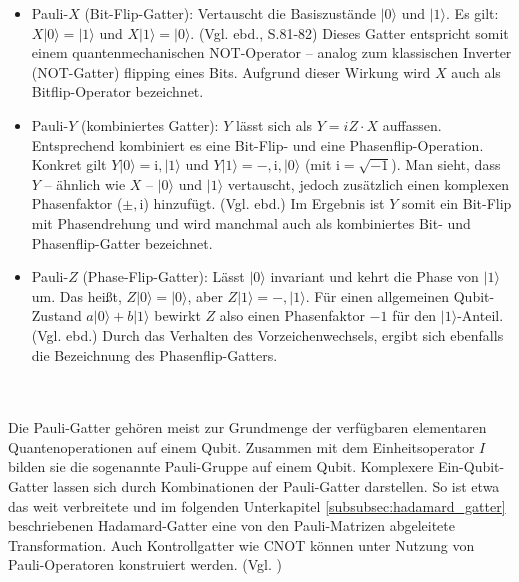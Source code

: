 \begin{itemize}
\item Pauli-$X$ (Bit-Flip-Gatter): Vertauscht die Basiszustände $|0\rangle$ und $|1\rangle$. Es gilt: $X|0\rangle = |1\rangle$ und $X|1\rangle = |0\rangle$. (Vgl. ebd., S.81-82) Dieses Gatter entspricht somit einem quantenmechanischen NOT-Operator – analog zum klassischen Inverter (NOT-Gatter) flipping eines Bits. Aufgrund dieser Wirkung wird $X$ auch als Bitflip-Operator bezeichnet. 

\item Pauli-$Y$ (kombiniertes Gatter): $Y$ lässt sich als $Y = iZ \cdot X$ auffassen. Entsprechend kombiniert es eine Bit-Flip- und eine Phasenflip-Operation. Konkret gilt $Y|0\rangle = \mathrm{i},|1\rangle$ und $Y|1\rangle = -,\mathrm{i},|0\rangle$ (mit $\mathrm{i}=\sqrt{-1}$). Man sieht, dass $Y$ – ähnlich wie $X$ – $|0\rangle$ und $|1\rangle$ vertauscht, jedoch zusätzlich einen komplexen Phasenfaktor ($\pm,\mathrm{i}$) hinzufügt. (Vgl. ebd.) Im Ergebnis ist $Y$ somit ein Bit-Flip mit Phasendrehung und wird manchmal auch als kombiniertes Bit- und Phasenflip-Gatter bezeichnet.

\item Pauli-$Z$ (Phase-Flip-Gatter): Lässt $|0\rangle$ invariant und kehrt die Phase von $|1\rangle$ um. Das heißt, $Z|0\rangle = |0\rangle$, aber $Z|1\rangle = -,|1\rangle$. Für einen allgemeinen Qubit-Zustand $a|0\rangle + b|1\rangle$ bewirkt $Z$ also einen Phasenfaktor $-1$ für den $|1\rangle$-Anteil. (Vgl. ebd.) Durch das Verhalten des Vorzeichenwechsels, ergibt sich ebenfalls die Bezeichnung des Phasenflip-Gatters.

\end{itemize}\\
\\
Die Pauli-Gatter gehören meist zur Grundmenge der verfügbaren elementaren Quantenoperationen auf einem Qubit. Zusammen mit dem Einheitsoperator $I$ bilden sie die sogenannte Pauli-Gruppe auf einem Qubit. Komplexere Ein-Qubit-Gatter lassen sich durch Kombinationen der Pauli-Gatter darstellen. So ist etwa das weit verbreitete und im folgenden Unterkapitel \ref{subsubsec:hadamard_gatter} beschriebenen Hadamard-Gatter eine von den Pauli-Matrizen abgeleitete Transformation. Auch Kontrollgatter wie CNOT können unter Nutzung von Pauli-Operatoren konstruiert werden. (Vgl. \cite[S.312]{wekesa_sirengo_mathematical_2024})
\\

